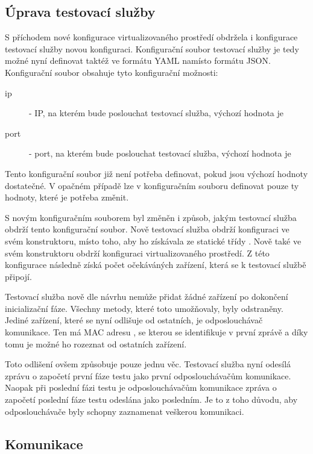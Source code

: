 \subsection{Úprava testovací služby}\label{sec:test_service_changes}

S příchodem nové konfigurace virtualizovaného prostředí obdržela i konfigurace testovací služby novou konfiguraci. Konfigurační soubor testovací služby je tedy možné nyní definovat taktéž ve formátu YAML namísto formátu JSON. Konfigurační soubor obsahuje tyto konfigurační možnosti:

\begin{description}
    \item[ip] - IP, na kterém bude poslouchat testovací služba, výchozí hodnota je 
    \item[port] - port, na kterém bude poslouchat testovací služba, výchozí hodnota je 
\end{description}


Tento konfigurační soubor již není potřeba definovat, pokud jsou výchozí hodnoty dostatečné. V opačném případě lze v konfiguračním souboru definovat pouze ty hodnoty, které je potřeba změnit. 

S novým konfiguračním souborem byl změněn i způsob, jakým testovací služba obdrží tento konfigurační soubor. Nově testovací služba obdrží konfiguraci ve svém konstruktoru, místo toho, aby ho získávala ze statické třídy . Nově také ve svém konstruktoru obdrží konfiguraci virtualizovaného prostředí. Z této konfigurace následně získá počet očekáváných zařízení, která se k testovací službě připojí. 

Testovací služba nově dle návrhu nemůže přidat žádné zařízení po dokončení inicializační fáze. Všechny metody, které toto umožňovaly, byly odstraněny. Jediné zařízení, které se nyní odlišuje od ostatních, je odposlouchávač komunikace. Ten má MAC adresu , se kterou se identifikuje v první zprávě a díky tomu je možné ho rozeznat od ostatních zařízení. 

Toto odlišení ovšem způsobuje pouze jednu věc. Testovací služba nyní odesílá zprávu o započetí první fáze testu jako první odposlouchávačům komunikace. Naopak při poslední fázi testu je odposlouchávačům komunikace zpráva o započetí poslední fáze testu odeslána jako posledním. Je to z toho důvodu, aby odposlouchávače byly schopny zaznamenat veškerou komunikaci. 

\subsection{Komunikace}

